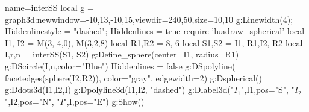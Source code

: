 \documentclass[12pt]{standalone}
\begin{document}
\begin{luadraw}{name=interSS}
local g = graph3d:new{window={-10,13,-10,15},viewdir={240,50},size={10,10}}
 g:Linewidth(4); Hiddenlinestyle = "dashed"; Hiddenlines = true
require 'luadraw_spherical'
local I1, I2 = M(3,-4,0), M(3,2,8)
local R1,R2 = 8, 6
local S1,S2 = {I1, R1},{I2, R2}
local I,r,n = interSS(S1, S2)
g:Define_sphere({center=I1, radius=R1}) 
g:DScircle({I,n},{color="Blue"})
Hiddenlines = false
g:DSpolyline( facetedges(sphere(I2,R2)), {color="gray", edgewidth=2})
g:Dspherical()
g:Ddots3d({I1,I2,I})
g:Dpolyline3d({I1,I2}, "dashed")
g:Dlabel3d("$I_1$",I1,{pos="S"}, "$I_2$",I2,{pos="N"}, "$I$",I,{pos="E"})
g:Show()
\end{luadraw} 
\end{document}
